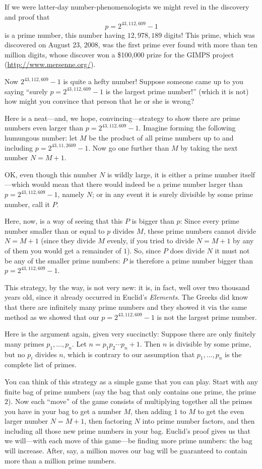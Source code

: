 \documentclass[11pt]{article}
\theoremstyle{plain}
\theoremstyle{definition}
\numberwithin{equation}{section}
\numberwithin{figure}{section}
\numberwithin{table}{section}
\begin{document}
If we were latter-day number-phenomenologists we might revel in the
discovery and proof that
$$
  p=2^{43,112,609}-1
$$ 
is a prime number, this number having $12,\!978,\!189$ digits!  This
prime, which was discovered on August 23, 2008, was the first prime
ever found with more than ten million digits, whose discover won a
\$100,000 prize for the GIMPS project (\url{http://www.mersenne.org/}).

Now $2^{43,112,609}-1$ is quite a hefty number! Suppose someone came
up to you saying ``surely $p = 2^{43,112,609}-1$ is the largest prime
number!'' (which it is not) how might you convince that person that
he or she is wrong?

Here is a neat---and, we hope, convincing---strategy to show there are
prime numbers even larger than $p = 2^{43,112,609} - 1$. Imagine
forming the following humungous number: let $M$ be the product of all
prime numbers up to and including $p = 2^{43,11,2609} - 1$.  Now go
one further than $M$ by taking the next number $N=M+1$.
 

OK, even though this number $N$ is wildly large, it is either a prime
number itself---which would mean that there would indeed be a prime
number larger than $p=2^{43,112,609} - 1$, namely $N$; or in any event it is
surely divisible by some prime number, call it $P$.

Here, now, is a way of seeing that this $P$ is bigger than $p$: Since
every prime number smaller than or equal to $p$ divides $M$, these
prime numbers cannot divide $N= M+1$ (since they divide $M$ evenly, if
you tried to divide $N=M+1$ by any of them you would get a remainder
of $1$).  So, since $P$ does divide $N$ it must not be any of the
smaller prime numbers: $P$ is therefore a prime number bigger than $p=
2^{43,112,609}-1$.

This strategy, by the way, is not very new: it is, in fact, well over
two thousand years old, since it already occurred in Euclid's {\em
  Elements}. The Greeks did know that there are infinitely many prime
numbers and they showed it via the same method as we showed that our
$p = 2^{43,112,609} - 1$ is not the largest prime number.

Here is the argument again, given very succinctly: Suppose there are
only finitely many primes $p_1, \ldots, p_n$.  Let $n=p_1 p_2 \cdots
p_n + 1$.  Then $n$ is divisible by some prime, but no $p_i$ divides
$n$, which is contrary to our assumption that $p_1, \ldots, p_n$ is
the complete list of primes.


You can think of this strategy as a simple game that you can
play. Start with any finite bag of prime numbers (say the bag that
only contains one prime, the prime $2$). Now each ``move'' of the game
consists of multiplying together all the primes you have in your bag
to get a number $M$, then adding $1$ to $M$ to get the even larger
number $N=M+1$, then factoring $N$ into prime number factors, and then
including all those new prime numbers in your bag. Euclid's proof
gives us that we will---with each move of this game---be finding more
prime numbers: the bag will increase. After, say, a million moves our
bag will be guaranteed to contain more than a million prime numbers.
\end{document}
